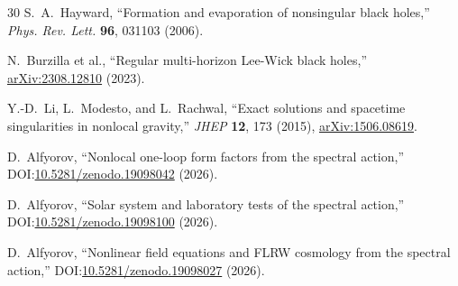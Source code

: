 \documentclass[11pt,a4paper]{article}
\theoremstyle{definition}
\theoremstyle{remark}
\begin{document}
\begin{thebibliography}{30}
S.~A.~Hayward, ``Formation and evaporation of nonsingular black holes,''
\textit{Phys. Rev. Lett.} \textbf{96}, 031103 (2006).

N.~Burzilla et al., ``Regular multi-horizon Lee-Wick black holes,''
\href{https://arxiv.org/abs/2308.12810}{arXiv:2308.12810} (2023).

Y.-D.~Li, L.~Modesto, and L.~Rachwal,
``Exact solutions and spacetime singularities in nonlocal gravity,''
\textit{JHEP} \textbf{12}, 173 (2015),
\href{https://arxiv.org/abs/1506.08619}{arXiv:1506.08619}.

D.~Alfyorov, ``Nonlocal one-loop form factors from the spectral action,''
DOI:\href{https://doi.org/10.5281/zenodo.19098042}{10.5281/zenodo.19098042} (2026).

D.~Alfyorov, ``Solar system and laboratory tests of the spectral action,''
DOI:\href{https://doi.org/10.5281/zenodo.19098100}{10.5281/zenodo.19098100} (2026).

D.~Alfyorov, ``Nonlinear field equations and FLRW cosmology from the spectral action,''
DOI:\href{https://doi.org/10.5281/zenodo.19098027}{10.5281/zenodo.19098027} (2026).

\end{thebibliography}
\end{document}
